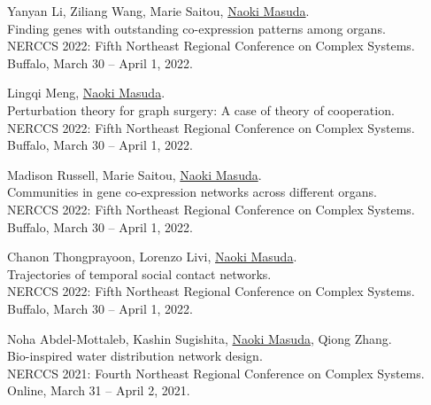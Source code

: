 \documentclass[11pt,letter]{article}
\begin{document}
\begin{etaremune}
\item Yanyan Li, Ziliang Wang, Marie Saitou, \underline{Naoki Masuda}.\\
Finding genes with outstanding co-expression patterns among organs.\\
NERCCS 2022: Fifth Northeast Regional Conference on Complex Systems.\\
Buffalo, March 30 -- April 1, 2022.

\item Lingqi Meng, \underline{Naoki Masuda}.\\
Perturbation theory for graph surgery: A case of theory of cooperation.\\
NERCCS 2022: Fifth Northeast Regional Conference on Complex Systems.\\
Buffalo, March 30 -- April 1, 2022.

\item Madison Russell, Marie Saitou, \underline{Naoki Masuda}.\\
Communities in gene co-expression networks across different organs.\\
NERCCS 2022: Fifth Northeast Regional Conference on Complex Systems.\\
Buffalo, March 30 -- April 1, 2022.

\item Chanon Thongprayoon, Lorenzo Livi, \underline{Naoki Masuda}.\\
Trajectories of temporal social contact networks.\\
NERCCS 2022: Fifth Northeast Regional Conference on Complex Systems.\\
Buffalo, March 30 -- April 1, 2022.

%


\item Noha Abdel-Mottaleb, Kashin Sugishita, \underline{Naoki Masuda}, Qiong Zhang.\\
Bio-inspired water distribution network design.\\
NERCCS 2021: Fourth Northeast Regional Conference on Complex Systems.\\
Online, March 31 -- April 2, 2021.


\end{etaremune}
\end{document}
